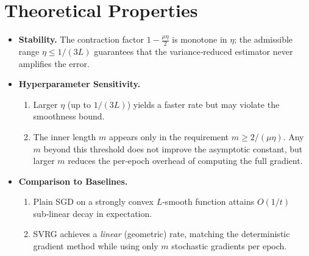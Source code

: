 \documentclass[11pt]{article}
\begin{document}
\section*{Theoretical Properties}
\begin{itemize}
\item \textbf{Stability.} The contraction factor $1-\frac{\mu\eta}{2}$ is monotone in $\eta$; the admissible range $\eta\le 1/(3L)$ guarantees that the variance‑reduced estimator never amplifies the error.
\item \textbf{Hyperparameter Sensitivity.}
    \begin{enumerate}
        \item Larger $\eta$ (up to $1/(3L)$) yields a faster rate but may violate the smoothness bound.
        \item The inner length $m$ appears only in the requirement $m\ge 2/(\mu\eta)$. Any $m$ beyond this threshold does not improve the asymptotic constant, but larger $m$ reduces the per‑epoch overhead of computing the full gradient.
    \end{enumerate}
\item \textbf{Comparison to Baselines.}
    \begin{enumerate}
        \item Plain SGD on a strongly convex $L$‑smooth function attains $O(1/t)$ sub‑linear decay in expectation.
        \item SVRG achieves a \emph{linear} (geometric) rate, matching the deterministic gradient method while using only $m$ stochastic gradients per epoch.
    \end{enumerate}
\end{itemize}

\end{document}
